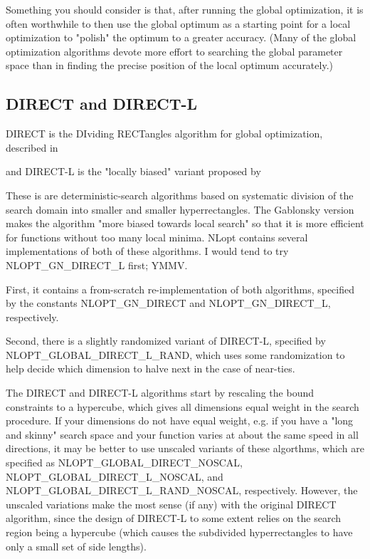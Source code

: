 Something you should consider is that, after running the global optimization, it is often worthwhile to then use the global optimum as a starting point for a local optimization to "polish" the optimum to a greater accuracy. (Many of the global optimization algorithms devote more effort to searching the global parameter space than in finding the precise position of the local optimum accurately.) 




\subsection{DIRECT and DIRECT-L}
DIRECT is the DIviding RECTangles algorithm for global optimization, described in \cite{Jones_1993}

and DIRECT-L is the "locally biased" variant proposed by \cite{Gablonsky_2001}

These is are deterministic-search algorithms based on systematic division of the search domain into smaller and smaller hyperrectangles. The Gablonsky version makes the algorithm "more biased towards local search" so that it is more efficient for functions without too many local minima. NLopt contains several implementations of both of these algorithms. I would tend to try NLOPT\_GN\_DIRECT\_L first; YMMV. 

First, it contains a from-scratch re-implementation of both algorithms, specified by the constants NLOPT\_GN\_DIRECT and NLOPT\_GN\_DIRECT\_L, respectively. 

Second, there is a slightly randomized variant of DIRECT-L, specified by NLOPT\_GLOBAL\_DIRECT\_L\_RAND, which uses some randomization to help decide which dimension to halve next in the case of near-ties. 

The DIRECT and DIRECT-L algorithms start by rescaling the bound constraints to a hypercube, which gives all dimensions equal weight in the search procedure. If your dimensions do not have equal weight, e.g. if you have a "long and skinny" search space and your function varies at about the same speed in all directions, it may be better to use unscaled variants of these algorthms, which are specified as NLOPT\_GLOBAL\_DIRECT\_NOSCAL, NLOPT\_GLOBAL\_DIRECT\_L\_NOSCAL, and NLOPT\_GLOBAL\_DIRECT\_L\_RAND\_NOSCAL, respectively. However, the unscaled variations make the most sense (if any) with the original DIRECT algorithm, since the design of DIRECT-L to some extent relies on the search region being a hypercube (which causes the subdivided hyperrectangles to have only a small set of side lengths). 

